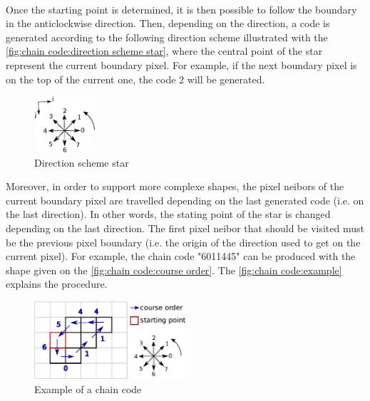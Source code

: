 ~~



Once the starting point is determined, it is then possible to follow the boundary in the anticlockwise direction. Then, depending on the direction, a code is generated according to the following direction scheme illustrated with the \vref{fig:chain code:direction scheme star}, where the central point of the star represent the current boundary pixel. For example, if the next boundary pixel is on the top of the current one, the code 2 will be generated. 



\begin{figure}[H]
	\centering
	\includegraphics[width=0.2\textwidth]{images/chain_code/direction_scheme_star}
	\caption{Direction scheme star \cite{bib:chain:ParametreGeometriqueChaineFreeman}}
	\label{fig:chain code:direction scheme star}	
\end{figure}

Moreover, in order to support more complexe shapes, the pixel neibors of the current boundary pixel are travelled depending on the last generated code (i.e. on the last direction). In other words, the stating point of the star is changed depending on the last direction. The first pixel neibor that should be visited must be the previous pixel boundary (i.e. the origin of the direction used to get on the current pixel). For example, the chain code "6011445" can be produced with the shape given on the \vref{fig:chain code:course order}. The \vref{fig:chain code:example} explains the procedure. 

\begin{figure}[H]
	\centering
	\includegraphics[width=0.5\textwidth]{images/chain_code/example}
	\caption{Example of a chain code}
	\label{fig:chain code:example}	
\end{figure}

